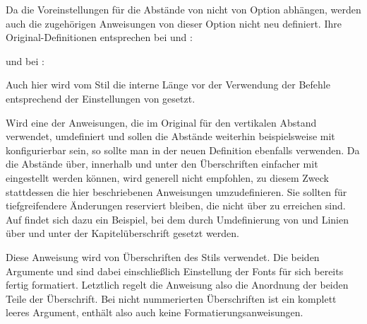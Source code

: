Da die Voreinstellungen für die Abstände von  nicht
von Option  abhängen, werden auch die
zugehörigen Anweisungen von dieser Option nicht neu
definiert. Ihre Original-Definitionen entsprechen bei  und
:
\begin{lstcode}
  \newcommand*{\partheadstartvskip}{%
    \null\vskip-\baselineskip\vskip\@tempskipa
  }
  \newcommand*{\partheadmidvskip}{%
    \par\nobreak\vskip\@tempskipa
  }
  \newcommand*{\partheadendvskip}{%
    \vskip\@tempskipa\newpage
  }
\end{lstcode}
und bei :
\begin{lstcode}
  \newcommand*{\partheadstartvskip}{%
    \addvspace{\@tempskipa}%
  }
  \newcommand*{\partheadmidvskip}{%
    \par\nobreak
  }
  \newcommand*{\partheadendvskip}{%
    \vskip\@tempskipa
  }
\end{lstcode}
Auch hier wird vom Stil  die interne Länge
 vor der
Verwendung der Befehle entsprechend der Einstellungen von
gesetzt.

Wird eine der Anweisungen, die im Original  für den
vertikalen Abstand verwendet, umdefiniert und sollen die Abstände weiterhin
beispielsweise mit 
konfigurierbar sein, so sollte man in der neuen Definition ebenfalls
 verwenden. Da die Abstände über, innerhalb und
unter den Überschriften einfacher mit
 eingestellt werden können,
wird generell nicht empfohlen, zu diesem Zweck stattdessen die hier
beschriebenen Anweisungen umzudefinieren. Sie sollten für tiefgreifendere
Änderungen reserviert bleiben, die nicht über
 zu erreichen sind.
Auf \cite{homepage} findet sich dazu ein Beispiel, bei
dem durch Umdefinierung von  und
 Linien über und unter der Kapitelüberschrift
gesetzt werden.%
%
\EndIndexGroup


\begin{Declaration}
\end{Declaration}
Diese Anweisung wird von Überschriften des Stils
 verwendet. Die beiden
Argumente  und  sind dabei einschließlich
Einstellung der Fonts für sich bereits fertig formatiert. Letztlich regelt die
Anweisung also die Anordnung der beiden Teile der Überschrift. Bei nicht
nummerierten Überschriften ist  ein komplett leeres Argument,
enthält also auch keine Formatierungsanweisungen.

